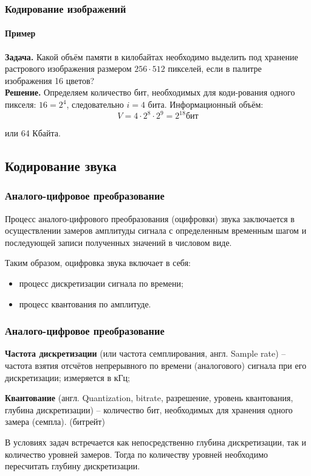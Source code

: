 \begin{frame}
\frametitle{Кодирование изображений}
\framesubtitle{Пример}

\textbf{Задача.} Какой объём памяти в килобайтах необходимо выделить под хранение растрового изображения размером $256\cdot512$ пикселей, если в палитре изображения 16 цветов?
 \\ \pause
\textbf{Решение.} Определяем количество бит, необходимых для  коди-рования одного пикселя: 
$16 = 2^4$, следовательно $i=4$ бита.
Информационный объём: 
$$V=4\cdot 2^8 \cdot 2^9=2^{18} бит$$

или 64 Кбайта.

\end{frame}

 \subsection{Кодирование звука}

\begin{frame}
\frametitle{Аналого-цифровое преобразование}

Процесс аналого-цифрового преобразования (оцифровки) звука заключается в осуществлении замеров амплитуды сигнала с определенным временным шагом и последующей записи полученных значений в числовом виде.

Таким образом, оцифровка звука включает в себя:
\begin{itemize}
\item процесс дискретизации сигнала по времени;
\item процесс квантования по амплитуде.

\end{itemize}

\end{frame}

\begin{frame}
\frametitle{Аналого-цифровое преобразование}

\textbf{Частота дискретизации} (или частота семплирования, англ. Sample rate) – частота взятия отсчётов непрерывного по времени (аналогового) сигнала при его дискретизации; измеряется в кГц;

\textbf{Квантование} (англ. Quantization, bitrate, разрешение, уровень квантования, глубина дискретизации) – количество бит, необходимых для хранения одного замера (семпла). (битрейт)

В условиях задач встречается как непосредственно глубина дискретизации, так и количество уровней замеров. Тогда по количеству уровней необходимо пересчитать глубину дискретизации.


\end{frame}

